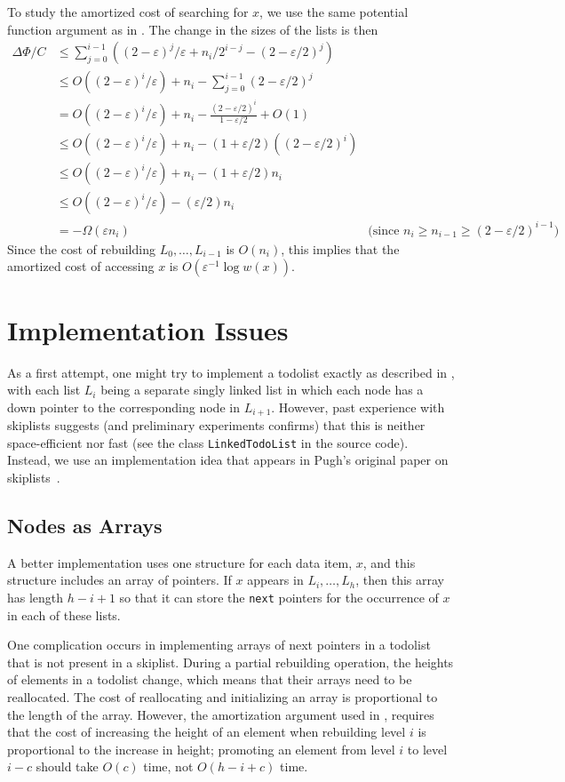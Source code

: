 \documentclass{patmorin}
\newcommand{\eps}{\varepsilon}
\begin{document}
To study the amortized cost of searching for $x$, we use the same
potential function argument as in .  The change in the sizes of the lists is then 
\begin{align*}
  \Delta\Phi/C & \le \sum_{j=0}^{i-1}\left((2-\eps)^j/\eps + n_i/2^{i-j} - (2-\eps/2)^j\right) \\
  & \le O((2-\eps)^i/\eps) + n_i - \sum_{j=0}^{i-1}(2-\eps/2)^j \\
  & = O((2-\eps)^i/\eps) + n_i - \frac{(2-\eps/2)^i}{1-\eps/2} + O(1) \\
  & \le O((2-\eps)^i/\eps) + n_i - (1+\eps/2)((2-\eps/2)^i) \\
  & \le O((2-\eps)^i/\eps) + n_i - (1+\eps/2)n_i \\
  & \le O((2-\eps)^i/\eps) - (\eps/2)n_i \\
  & = - \Omega(\eps n_i) & \text{(since $n_i \ge n_{i-1} \ge (2-\eps/2)^{i-1}$)}
\end{align*}
Since the cost of rebuilding $L_0,\ldots,L_{i-1}$ is $O(n_i)$, this implies that the amortized cost of accessing $x$ is $O(\eps^{-1}\log w(x))$.


\section{Implementation Issues}


As a first attempt, one might try to implement a todolist exactly
as described in , with each list $L_i$ being a
separate singly linked list in which each node has a down pointer to
the corresponding node in $L_{i+1}$.  However, past experience with
skiplists suggests (and preliminary experiments confirms) that this is
neither space-efficient nor fast (see the class \texttt{LinkedTodoList}
in the source code). Instead, we use an implementation idea that appears in
Pugh's original paper on skiplists~\cite{pugh:skip}.

\subsection{Nodes as Arrays}

A better implementation uses one structure for each data item, $x$,
and this structure includes an array of pointers.  If $x$ appears in
$L_{i},\ldots,L_h$, then this array has length $h-i+1$ so that it can
store the \texttt{next} pointers for the occurrence of $x$ in each of
these lists.  

One complication occurs in implementing arrays of next pointers in a
todolist that is not present in a skiplist.  During a partial rebuilding
operation, the heights of elements in a todolist change, which means
that their arrays need to be reallocated.  The cost of reallocating and
initializing an array is proportional to the length of the array. However,
the amortization argument used in , requires that the
cost of increasing the height of an element when rebuilding level $i$
is proportional to the increase in height; promoting an element from
level $i$ to level $i-c$ should take $O(c)$ time, not $O(h - i + c)$ time.
\end{document}
